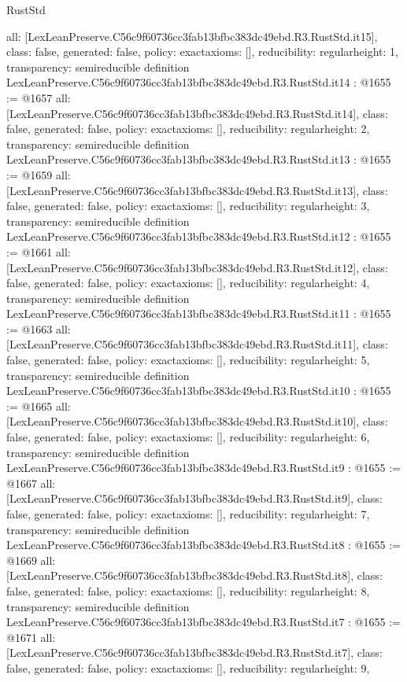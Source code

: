 \begin{lexlean}{RustStd}
\begin{coremodule}
{  all: [LexLeanPreserve.C56c9f60736cc3fab13bfbc383dc49ebd.R3.RustStd.it15],
  class: false,
  generated: false,
  policy: exact{axioms: []},
  reducibility: regular{height: 1},
  transparency: semireducible
}
definition LexLeanPreserve.C56c9f60736cc3fab13bfbc383dc49ebd.R3.RustStd.it14 : @1655 := @1657 {
  all: [LexLeanPreserve.C56c9f60736cc3fab13bfbc383dc49ebd.R3.RustStd.it14],
  class: false,
  generated: false,
  policy: exact{axioms: []},
  reducibility: regular{height: 2},
  transparency: semireducible
}
definition LexLeanPreserve.C56c9f60736cc3fab13bfbc383dc49ebd.R3.RustStd.it13 : @1655 := @1659 {
  all: [LexLeanPreserve.C56c9f60736cc3fab13bfbc383dc49ebd.R3.RustStd.it13],
  class: false,
  generated: false,
  policy: exact{axioms: []},
  reducibility: regular{height: 3},
  transparency: semireducible
}
definition LexLeanPreserve.C56c9f60736cc3fab13bfbc383dc49ebd.R3.RustStd.it12 : @1655 := @1661 {
  all: [LexLeanPreserve.C56c9f60736cc3fab13bfbc383dc49ebd.R3.RustStd.it12],
  class: false,
  generated: false,
  policy: exact{axioms: []},
  reducibility: regular{height: 4},
  transparency: semireducible
}
definition LexLeanPreserve.C56c9f60736cc3fab13bfbc383dc49ebd.R3.RustStd.it11 : @1655 := @1663 {
  all: [LexLeanPreserve.C56c9f60736cc3fab13bfbc383dc49ebd.R3.RustStd.it11],
  class: false,
  generated: false,
  policy: exact{axioms: []},
  reducibility: regular{height: 5},
  transparency: semireducible
}
definition LexLeanPreserve.C56c9f60736cc3fab13bfbc383dc49ebd.R3.RustStd.it10 : @1655 := @1665 {
  all: [LexLeanPreserve.C56c9f60736cc3fab13bfbc383dc49ebd.R3.RustStd.it10],
  class: false,
  generated: false,
  policy: exact{axioms: []},
  reducibility: regular{height: 6},
  transparency: semireducible
}
definition LexLeanPreserve.C56c9f60736cc3fab13bfbc383dc49ebd.R3.RustStd.it9 : @1655 := @1667 {
  all: [LexLeanPreserve.C56c9f60736cc3fab13bfbc383dc49ebd.R3.RustStd.it9],
  class: false,
  generated: false,
  policy: exact{axioms: []},
  reducibility: regular{height: 7},
  transparency: semireducible
}
definition LexLeanPreserve.C56c9f60736cc3fab13bfbc383dc49ebd.R3.RustStd.it8 : @1655 := @1669 {
  all: [LexLeanPreserve.C56c9f60736cc3fab13bfbc383dc49ebd.R3.RustStd.it8],
  class: false,
  generated: false,
  policy: exact{axioms: []},
  reducibility: regular{height: 8},
  transparency: semireducible
}
definition LexLeanPreserve.C56c9f60736cc3fab13bfbc383dc49ebd.R3.RustStd.it7 : @1655 := @1671 {
  all: [LexLeanPreserve.C56c9f60736cc3fab13bfbc383dc49ebd.R3.RustStd.it7],
  class: false,
  generated: false,
  policy: exact{axioms: []},
  reducibility: regular{height: 9},
}
\end{coremodule}
\end{lexlean}
